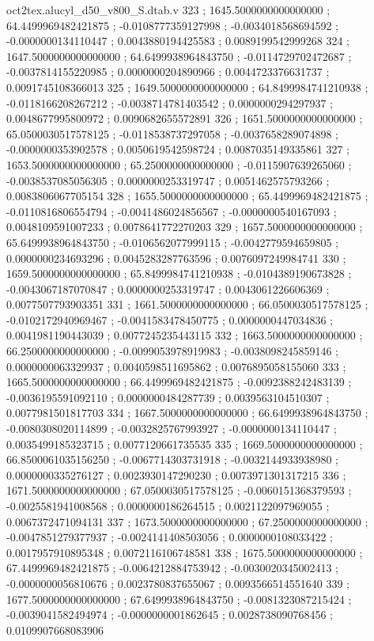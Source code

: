 \begin{filecontents}[overwrite]{oct2tex.alucyl_d50_v800_S.dtab.v}
323 ; 1645.5000000000000000 ; 64.4499969482421875 ; -0.0108777359127998 ; -0.0034018568694592 ; -0.0000000134110447 ; 0.0043880194425583 ; 0.0089199542999268
324 ; 1647.5000000000000000 ; 64.6499938964843750 ; -0.0114729702472687 ; -0.0037814155220985 ; 0.0000000204890966 ; 0.0044723376631737 ; 0.0091745108366013
325 ; 1649.5000000000000000 ; 64.8499984741210938 ; -0.0118166208267212 ; -0.0038714781403542 ; 0.0000000294297937 ; 0.0048677995800972 ; 0.0090682655572891
326 ; 1651.5000000000000000 ; 65.0500030517578125 ; -0.0118538737297058 ; -0.0037658289074898 ; -0.0000000353902578 ; 0.0050619542598724 ; 0.0087035149335861
327 ; 1653.5000000000000000 ; 65.2500000000000000 ; -0.0115907639265060 ; -0.0038537085056305 ; 0.0000000253319747 ; 0.0051462575793266 ; 0.0083806067705154
328 ; 1655.5000000000000000 ; 65.4499969482421875 ; -0.0110816806554794 ; -0.0041486024856567 ; -0.0000000540167093 ; 0.0048109591007233 ; 0.0078641772270203
329 ; 1657.5000000000000000 ; 65.6499938964843750 ; -0.0106562077999115 ; -0.0042779594659805 ; 0.0000000234693296 ; 0.0045283287763596 ; 0.0076097249984741
330 ; 1659.5000000000000000 ; 65.8499984741210938 ; -0.0104389190673828 ; -0.0043067187070847 ; 0.0000000253319747 ; 0.0043061226606369 ; 0.0077507793903351
331 ; 1661.5000000000000000 ; 66.0500030517578125 ; -0.0102172940969467 ; -0.0041583478450775 ; 0.0000000447034836 ; 0.0041981190443039 ; 0.0077245235443115
332 ; 1663.5000000000000000 ; 66.2500000000000000 ; -0.0099053978919983 ; -0.0038098245859146 ; 0.0000000063329937 ; 0.0040598511695862 ; 0.0076895058155060
333 ; 1665.5000000000000000 ; 66.4499969482421875 ; -0.0092388242483139 ; -0.0036195591092110 ; 0.0000000484287739 ; 0.0039563104510307 ; 0.0077981501817703
334 ; 1667.5000000000000000 ; 66.6499938964843750 ; -0.0080308020114899 ; -0.0032825767993927 ; -0.0000000134110447 ; 0.0035499185323715 ; 0.0077120661735535
335 ; 1669.5000000000000000 ; 66.8500061035156250 ; -0.0067714303731918 ; -0.0032144933938980 ; 0.0000000335276127 ; 0.0023930147290230 ; 0.0073971301317215
336 ; 1671.5000000000000000 ; 67.0500030517578125 ; -0.0060151368379593 ; -0.0025581941008568 ; 0.0000000186264515 ; 0.0021122097969055 ; 0.0067372471094131
337 ; 1673.5000000000000000 ; 67.2500000000000000 ; -0.0047851279377937 ; -0.0024141408503056 ; 0.0000000108033422 ; 0.0017957910895348 ; 0.0072116106748581
338 ; 1675.5000000000000000 ; 67.4499969482421875 ; -0.0064212884753942 ; -0.0030020345002413 ; -0.0000000056810676 ; 0.0023780837655067 ; 0.0093566514551640
339 ; 1677.5000000000000000 ; 67.6499938964843750 ; -0.0081323087215424 ; -0.0039041582494974 ; -0.0000000001862645 ; 0.0028738090768456 ; 0.0109907668083906

\end{filecontents}
